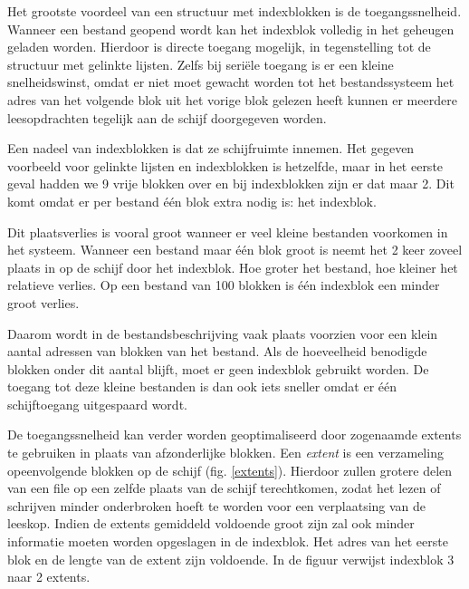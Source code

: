 Het grootste voordeel van een structuur met indexblokken is de
toegangssnelheid. Wanneer een bestand geopend wordt kan het indexblok
volledig in het geheugen geladen worden. Hierdoor is directe toegang
mogelijk, in tegenstelling tot de structuur met gelinkte lijsten.
Zelfs bij seri\"ele toegang is er een kleine snelheidswinst, omdat er
niet moet gewacht worden tot het bestandssysteem het adres van het
volgende blok uit het vorige blok gelezen heeft kunnen er meerdere
leesopdrachten tegelijk aan de schijf doorgegeven worden.

Een nadeel van indexblokken is dat ze schijfruimte innemen. Het
gegeven voorbeeld voor gelinkte lijsten en indexblokken is hetzelfde,
maar in het eerste geval hadden we 9 vrije blokken over en bij
indexblokken zijn er dat maar 2. Dit komt omdat er per bestand \'e\'en
blok extra nodig is: het indexblok.

Dit plaatsverlies is vooral groot wanneer er veel kleine
bestanden voorkomen in het systeem. Wanneer een bestand maar \'e\'en blok
groot is neemt het 2 keer zoveel plaats in op de schijf door het
indexblok. Hoe groter het bestand, hoe kleiner het relatieve verlies.
Op een bestand van 100 blokken is \'e\'en indexblok een minder groot
verlies.

Daarom wordt in de bestandsbeschrijving vaak plaats voorzien
voor een klein aantal adressen van blokken van het bestand. Als de
hoeveelheid benodigde blokken onder dit aantal blijft, moet er geen
indexblok gebruikt worden. De toegang tot deze kleine bestanden is dan
ook iets sneller omdat er \'e\'en schijftoegang uitgespaard wordt.

De toegangssnelheid kan verder worden geoptimaliseerd door
zogenaamde extents te gebruiken in plaats van afzonderlijke blokken.
Een \emph{extent} is een verzameling opeenvolgende
blokken op de schijf (fig. \ref{extents}). Hierdoor zullen grotere delen van een file op
een zelfde plaats van de schijf terechtkomen, zodat het lezen of
schrijven minder onderbroken hoeft te worden voor een verplaatsing van
de leeskop. Indien de extents gemiddeld voldoende groot zijn zal ook
minder informatie moeten worden opgeslagen in de indexblok. Het adres
van het eerste blok en de lengte van de extent zijn voldoende. In de
figuur verwijst indexblok 3 naar 2 extents.

